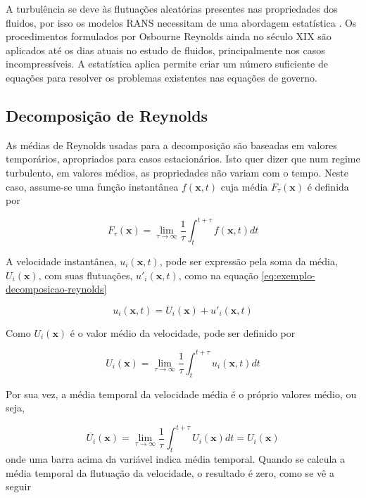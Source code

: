 A turbulência se deve às flutuações aleatórias presentes nas propriedades dos fluidos, por isso os modelos RANS necessitam de uma abordagem estatística \cite{Wilcox2006}. Os procedimentos formulados por Osbourne Reynolds ainda no século XIX são aplicados até os dias atuais no estudo de fluidos, principalmente nos casos incompressíveis. A estatística aplica permite criar um número suficiente de equações para resolver os problemas existentes nas equações de governo.

\subsection{Decomposição de Reynolds}

As médias de Reynolds usadas para a decomposição são baseadas em valores temporários, apropriados para casos estacionários. Isto quer dizer que num regime turbulento, em valores médios, as propriedades não variam com o tempo. Neste caso, assume-se uma função instantânea $f(\textbf{x},t)$ cuja média $F_{\tau}(\textbf{x})$ é definida por

\begin{equation}
	F_{\tau}(\textbf{x}) = \lim_{\tau \rightarrow \infty} \frac{1}{\tau}\int_{t}^{t+\tau}f(\textbf{x},t)dt
\end{equation}

A velocidade instantânea, $u_i(\textbf{x},t)$, pode ser expressão pela soma da média, $U_i(\textbf{x})$, com suas flutuações, $u'_i(\textbf{x},t)$, como na equação \ref{eq:exemplo-decomposicao-reynolds}

\begin{equation}
	\label{eq:exemplo-decomposicao-reynolds}
	u_{i}(\textbf{x},t) = U_{i}(\textbf{x}) + u'_{i}(\textbf{x},t)
\end{equation} 

Como $U_{i}(\textbf{x})$ é o valor médio da velocidade, pode ser definido por 

\begin{equation}
	U_{i}(\textbf{x}) = \lim_{\tau \rightarrow \infty} \frac{1}{\tau}\int_{t}^{t+\tau}u_i(\textbf{x},t)dt
\end{equation}

Por sua vez, a média temporal da velocidade média é o próprio valores médio, ou seja,

\begin{equation}
	\overline{U_{i}}(\textbf{x}) = \lim_{\tau \rightarrow \infty} \frac{1}{\tau}\int_{t}^{t+\tau}U_i(\textbf{x})dt = U_i(\textbf{x})
\end{equation}
%
onde uma barra acima da variável indica média temporal. Quando se calcula a média temporal da flutuação da velocidade, o resultado é zero, como se vê a seguir

